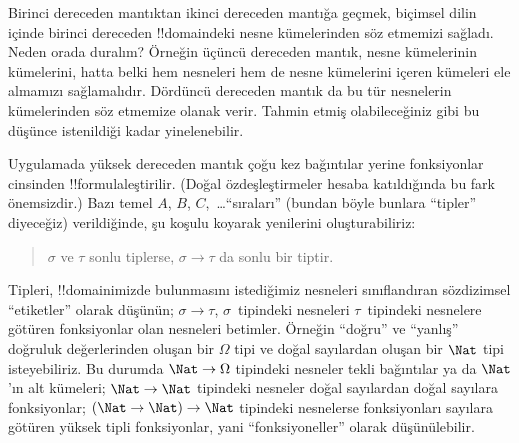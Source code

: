 



Birinci dereceden mantıktan ikinci dereceden mantığa geçmek, biçimsel dilin
içinde birinci dereceden !!{domain}{}deki nesne kümelerinden söz etmemizi
sağladı. Neden orada duralım? Örneğin üçüncü dereceden mantık, nesne
kümelerinin kümelerini, hatta belki hem nesneleri hem de nesne kümelerini
içeren kümeleri ele almamızı sağlamalıdır. Dördüncü dereceden mantık da bu
tür nesnelerin kümelerinden söz etmemize olanak verir. Tahmin etmiş
olabileceğiniz gibi bu düşünce istenildiği kadar yinelenebilir.

Uygulamada yüksek dereceden mantık çoğu kez bağıntılar yerine fonksiyonlar
cinsinden !!{formula}{}leştirilir. (Doğal özdeşleştirmeler hesaba katıldığında bu fark
önemsizdir.) Bazı temel $A$, $B$, $C$,~\dots ``sıraları'' (bundan böyle bunlara
``tipler'' diyeceğiz) verildiğinde, şu koşulu koyarak yenilerini
oluşturabiliriz:
\begin{quote}
$\sigma$ ve $\tau$ sonlu tiplerse, $\sigma \to \tau$ da sonlu bir tiptir.
\end{quote}
Tipleri, !!{domain}{}imizde bulunmasını istediğimiz nesneleri sınıflandıran
sözdizimsel ``etiketler'' olarak düşünün; $\sigma \to \tau$, $\sigma$~tipindeki
nesneleri $\tau$~tipindeki nesnelere götüren fonksiyonlar olan nesneleri
betimler. Örneğin ``doğru'' ve ``yanlış'' doğruluk değerlerinden oluşan bir
$\Omega$ tipi ve doğal sayılardan oluşan bir $\Nat$ tipi isteyebiliriz. Bu
durumda $\Nat \to \Omega$ tipindeki nesneler tekli bağıntılar ya da $\Nat$'ın
alt kümeleri; $\Nat \to \Nat$ tipindeki nesneler doğal sayılardan doğal
sayılara fonksiyonlar; $(\Nat \to \Nat) \to \Nat$ tipindeki nesnelerse
fonksiyonları sayılara götüren yüksek tipli fonksiyonlar, yani
``fonksiyoneller'' olarak düşünülebilir.

